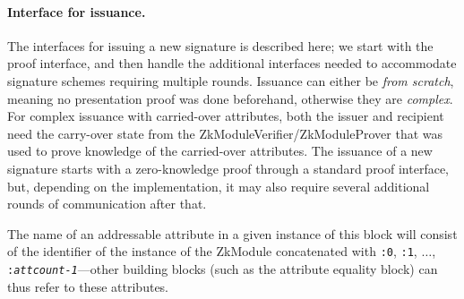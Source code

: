 
    \paragraph{Interface for issuance.}
    The interfaces for issuing a new signature is described here; we start with the proof interface,
    and then handle the additional interfaces needed to accommodate signature schemes requiring multiple rounds.
    Issuance can either be \emph{from scratch}, meaning no presentation proof was done beforehand,
    otherwise they are \emph{complex}. For complex issuance with carried-over attributes, both the issuer and recipient need
    the carry-over state from the ZkModuleVerifier/ZkModuleProver that was used to prove knowledge of the carried-over attributes.
    The issuance of a new signature starts with a zero-knowledge proof through a standard proof interface,
    but, depending on the implementation, it may also require several additional rounds of communication after that.

    The name of an addressable attribute in a given instance of this block
    will consist of the identifier of the instance of the ZkModule concatenated
    with \texttt{:0}, \texttt{:1}, $\ldots$, \texttt{:\emph{attcount-1}}---other
    building blocks (such as the attribute equality block) can thus refer to these
    attributes.

